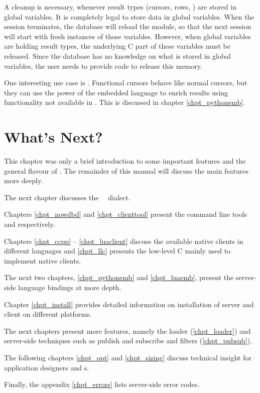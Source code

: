 A cleanup is necessary, whenever result types
(cursors, rows, \etc) are stored in global variables.
It is completely legal to store data in global variables.
When the session terminates, the database will reload
the module, so that the next session will start with
fresh instances of those variables. However, when
global variables are holding result types, the underlying
C part of these variables must be released.
Since the database has no knowledge on what is stored
in global variables, the user needs to provide code
to release this memory.

One interesting use case is .
Functional cursors behave like normal cursors,
but they can use the power of the embedded language
to enrich results
using functionality
not available in \sql.
This is discussed in chapter \ref{chpt_pythonemb}.

\section{What's Next?}
This chapter was only a brief introduction
to some important features and the general flavour 
of \nowdb. The remainder of this manual will
discuss the main features more deeply.

The next chapter discusses the \nowdb\ \sql\ dialect.

Chapters \ref{chpt_nowdbd} and \ref{chpt_clienttool}
present the command line tools 
and  respectively.

Chapters \ref{chpt_ccpp} -- \ref{chpt_luaclient}
discuss the available native clients in different
languages and \ref{chpt_llc} presents the low-level
C  mainly used to implement
native clients.

The next two chapters, \ref{chpt_pythonemb} and
\ref{chpt_luaemb}, present the server-side
language bindings at more depth.

Chapter \ref{chpt_install} provides detailed information
on installation of server and client on different
platforms.

The next chapters present more features,
namely the loader (\ref{chpt_loader}) and
server-side techniques such as publish and subscribe and
filters (\ref{chpt_pubsub}).

The following chapters 
\ref{chpt_opt} and \ref{chpt_sizing}
discuss technical insight
for application designers and s.

Finally, the appendix \ref{chpt_errors} lists server-side
error codes.


